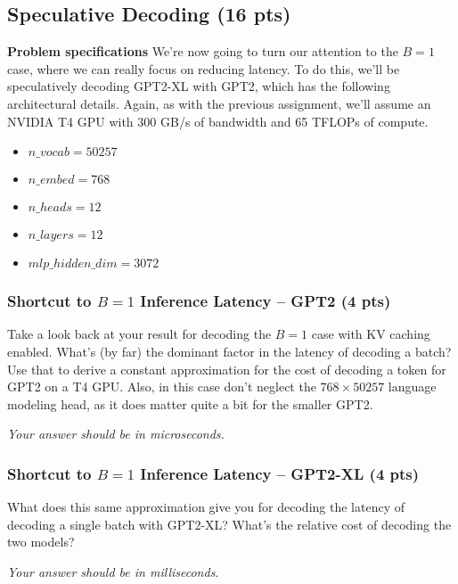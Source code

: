 \subsection{Speculative Decoding (16 pts)}

\textbf{Problem specifications} We're now going to turn our attention to the $B=1$ case, where we can really focus on reducing latency. To do this, we'll be speculatively decoding GPT2-XL with GPT2, which has the following architectural details. Again, as with the previous assignment, we'll assume an NVIDIA T4 GPU with 300 GB/s of bandwidth and 65 TFLOPs of compute.
\begin{itemize}
    \item $n\_vocab = 50257$
    \item $n\_embed = 768$
    \item $n\_heads = 12$
    \item $n\_layers = 12$
    \item $mlp\_hidden\_dim = 3072$
\end{itemize}
 

\subsubsection{Shortcut to $B=1$ Inference Latency -- GPT2 (4 pts)}

Take a look back at your result for decoding the $B=1$ case with KV caching enabled. What's (by far) the dominant factor in the latency of decoding a batch? Use that to derive a constant approximation for the cost of decoding a token for GPT2 on a T4 GPU. Also, in this case don't neglect the $768 \times 50257$ language modeling head, as it does matter quite a bit for the smaller GPT2.

\textit{Your answer should be in microseconds.}

\begin{answer}

\end{answer}

\subsubsection{Shortcut to $B=1$ Inference Latency -- GPT2-XL (4 pts)}

What does this same approximation give you for decoding the latency of decoding a single batch with GPT2-XL? What's the relative cost of decoding the two models?

\textit{Your answer should be in milliseconds.}

